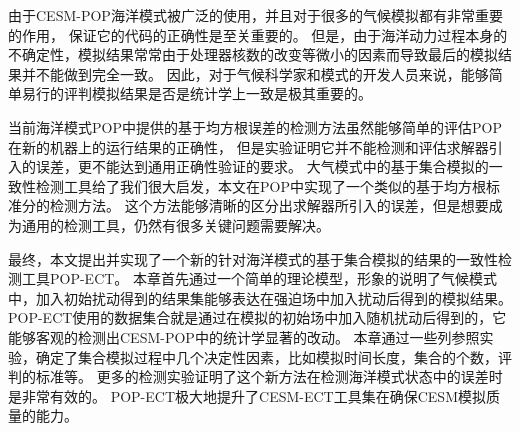 由于CESM-POP海洋模式被广泛的使用，并且对于很多的气候模拟都有非常重要的作用，
保证它的代码的正确性是至关重要的。 
但是，由于海洋动力过程本身的不确定性，模拟结果常常由于处理器核数的改变等微小的因素而导致最后的模拟结果并不能做到完全一致。
因此，对于气候科学家和模式的开发人员来说，能够简单易行的评判模拟结果是否是统计学上一致是极其重要的。

当前海洋模式POP中提供的基于均方根误差的检测方法虽然能够简单的评估POP在新的机器上的运行结果的正确性，
但是实验证明它并不能检测和评估求解器引入的误差，更不能达到通用正确性验证的要求。
大气模式中的基于集合模拟的一致性检测工具给了我们很大启发，本文在POP中实现了一个类似的基于均方根标准分的检测方法。
这个方法能够清晰的区分出求解器所引入的误差，但是想要成为通用的检测工具，仍然有很多关键问题需要解决。 


最终，本文提出并实现了一个新的针对海洋模式的基于集合模拟的结果的一致性检测工具POP-ECT。
本章首先通过一个简单的理论模型，形象的说明了气候模式中，加入初始扰动得到的结果集能够表达在强迫场中加入扰动后得到的模拟结果。
POP-ECT使用的数据集合就是通过在模拟的初始场中加入随机扰动后得到的，它能够客观的检测出CESM-POP中的统计学显著的改动。
本章通过一些列参照实验，确定了集合模拟过程中几个决定性因素，比如模拟时间长度，集合的个数，评判的标准等。
更多的检测实验证明了这个新方法在检测海洋模式状态中的误差时是非常有效的。 
POP-ECT极大地提升了CESM-ECT工具集在确保CESM模拟质量的能力。



